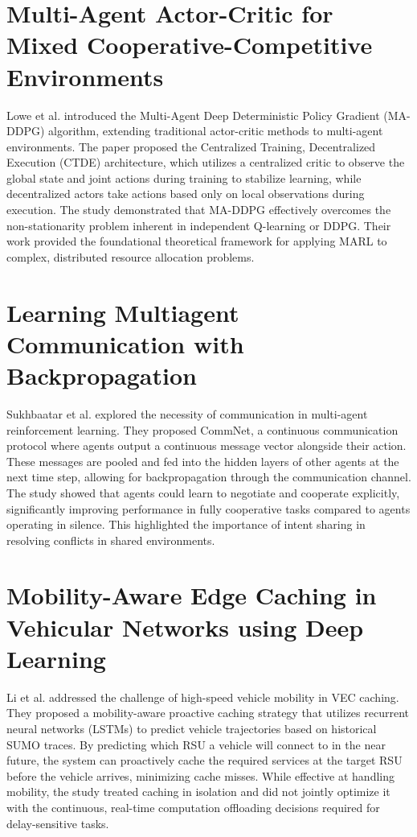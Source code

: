 \documentclass[12pt,a4paper]{report}
\begin{document}
\section{Multi-Agent Actor-Critic for Mixed Cooperative-Competitive Environments}
Lowe et al. introduced the Multi-Agent Deep Deterministic Policy Gradient (MA-DDPG) algorithm, extending traditional actor-critic methods to multi-agent environments. The paper proposed the Centralized Training, Decentralized Execution (CTDE) architecture, which utilizes a centralized critic to observe the global state and joint actions during training to stabilize learning, while decentralized actors take actions based only on local observations during execution. The study demonstrated that MA-DDPG effectively overcomes the non-stationarity problem inherent in independent Q-learning or DDPG. Their work provided the foundational theoretical framework for applying MARL to complex, distributed resource allocation problems.

\section{Learning Multiagent Communication with Backpropagation}
Sukhbaatar et al. explored the necessity of communication in multi-agent reinforcement learning. They proposed CommNet, a continuous communication protocol where agents output a continuous message vector alongside their action. These messages are pooled and fed into the hidden layers of other agents at the next time step, allowing for backpropagation through the communication channel. The study showed that agents could learn to negotiate and cooperate explicitly, significantly improving performance in fully cooperative tasks compared to agents operating in silence. This highlighted the importance of intent sharing in resolving conflicts in shared environments.

\section{Mobility-Aware Edge Caching in Vehicular Networks using Deep Learning}
Li et al. addressed the challenge of high-speed vehicle mobility in VEC caching. They proposed a mobility-aware proactive caching strategy that utilizes recurrent neural networks (LSTMs) to predict vehicle trajectories based on historical SUMO traces. By predicting which RSU a vehicle will connect to in the near future, the system can proactively cache the required services at the target RSU before the vehicle arrives, minimizing cache misses. While effective at handling mobility, the study treated caching in isolation and did not jointly optimize it with the continuous, real-time computation offloading decisions required for delay-sensitive tasks.
\end{document}
